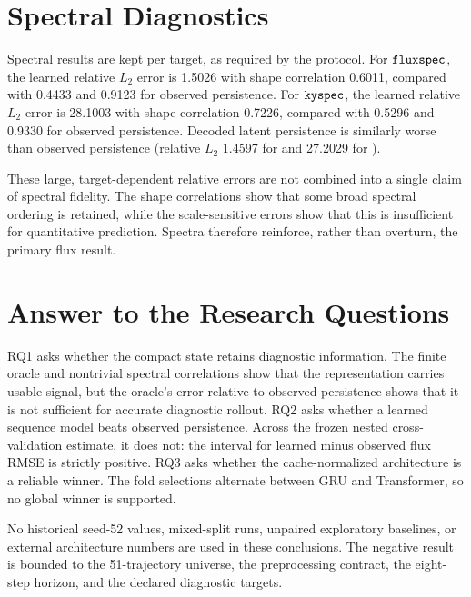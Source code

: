 \section{Spectral Diagnostics}

Spectral results are kept per target, as required by the protocol. For $\texttt{fluxspec}$, the
learned relative $L_2$ error is 1.5026 with shape correlation 0.6011, compared with 0.4433 and
0.9123 for observed persistence. For $\texttt{kyspec}$, the learned relative $L_2$ error is 28.1003
with shape correlation 0.7226, compared with 0.5296 and 0.9330 for observed persistence. Decoded
latent persistence is similarly worse than observed persistence (relative $L_2$ 1.4597 for
 and 27.2029 for ).

These large, target-dependent relative errors are not combined into a single claim of spectral
fidelity. The shape correlations show that some broad spectral ordering is retained, while the
scale-sensitive errors show that this is insufficient for quantitative prediction. Spectra
therefore reinforce, rather than overturn, the primary flux result.

\section{Answer to the Research Questions}

RQ1 asks whether the compact state retains diagnostic information. The finite oracle and nontrivial
spectral correlations show that the representation carries usable signal, but the oracle's error
relative to observed persistence shows that it is not sufficient for accurate diagnostic rollout.
RQ2 asks whether a learned sequence model beats observed persistence. Across the frozen nested
cross-validation estimate, it does not: the interval for learned minus observed flux RMSE is
strictly positive. RQ3 asks whether the cache-normalized architecture is a reliable winner. The
fold selections alternate between GRU and Transformer, so no global winner is supported.

No historical seed-52 values, mixed-split runs, unpaired exploratory baselines, or external
architecture numbers are used in these conclusions. The negative result is bounded to the
51-trajectory universe, the preprocessing contract, the eight-step horizon, and the declared
diagnostic targets.
